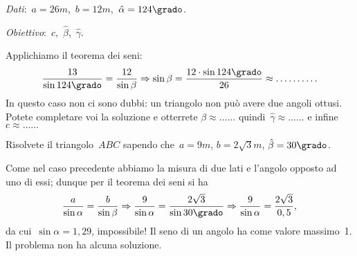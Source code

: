 \emph{Dati}:~$a= 26\unit{m}$,\quad~$b= 
12\unit{m}$,\quad~${\hat{\alpha}}=124\grado$.

\emph{Obiettivo}:~$c$,\quad~$\hat{\beta}$,\quad~$\hat{\gamma}$.

Applichiamo il teorema dei seni:
\[\frac{13}{\sin 124\grado}=\frac{12}{\sin \beta}\Rightarrow \sin 
\beta=\frac{12\cdot\sin 124\grado}{26}\approx\ldots \ldots \ldots.\]
In questo caso non ci sono dubbi: un triangolo non può avere due angoli ottusi. 
Potete completare voi la soluzione e otterrete
${\beta}{\approx}\ldots\ldots$ quindi~${\hat{\gamma}}{\approx} \ldots\ldots$ e 
infine~$c{\approx}\ldots\ldots$

\begin{problema}
Risolvete il triangolo~$ABC$ sapendo che~$a= 9\unit{m}$, $b=2 \sqrt 3\unit{m}$, 
${\hat{\beta}}=30\grado$.
\end{problema}
Come nel caso precedente abbiamo la misura di due lati e l'angolo opposto ad 
uno 
di essi; dunque per il teorema dei seni si ha
\[\frac{a}{\sin \alpha}=\frac{b}{\sin \beta} \Rightarrow \frac{9}{\sin 
\alpha}=\frac{2\sqrt{3}}{\sin 30\grado} \Rightarrow \frac{9}{\sin 
\alpha}=\frac{2\sqrt{3}}{0,5},\]
da cui~$\sin  \alpha=1,29$, impossibile! Il seno di un angolo ha come valore 
massimo~1.
Il problema non ha alcuna soluzione.

